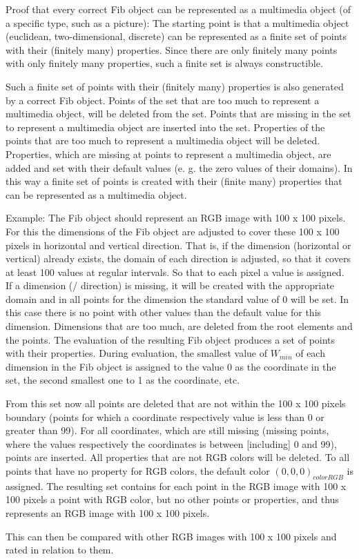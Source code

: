 \bigskip\noindent
Proof that every correct Fib object can be represented as a multimedia object (of a specific type, such as a picture):
The starting point is that a multimedia object (euclidean, two-dimensional, discrete) can be represented as a finite set of points with their (finitely many) properties. Since there are only finitely many points with only finitely many properties, such a finite set is always constructible.

Such a finite set of points with their (finitely many) properties is also generated by a correct Fib object. Points of the set that are too much to represent a multimedia object, will be deleted from the set. Points that are missing in the set to represent a multimedia object are inserted into the set. Properties of the points that are too much to represent a multimedia object will be deleted. Properties, which are missing at points to represent a multimedia object, are added and set with their default values (e. g. the zero values of their domains). In this way a finite set of points is created with their (finite many) properties that can be represented as a multimedia object.

\bigskip\noindent
Example: The Fib object should represent an RGB image with 100 x 100 pixels. For this the dimensions of the Fib object are adjusted to cover these 100 x 100 pixels in horizontal and vertical direction. That is, if the dimension (horizontal or vertical) already exists, the domain of each direction is adjusted, so that it covers at least 100 values at regular intervals. So that to each pixel a value is assigned. If a dimension (/ direction) is missing, it will be created with the appropriate domain and in all points for the dimension the standard value of 0 will be set. In this case there is no point with other values than the default value for this dimension. Dimensions that are too much, are deleted from the root elements and the points. The evaluation of the resulting Fib object produces a set of points with their properties. During evaluation, the smallest value of $W_{min}$ of each dimension in the Fib object is assigned to the value 0 as the coordinate in the set, the second smallest one to 1 as the coordinate, etc.

From this set now all points are deleted that are not within the 100 x 100 pixels boundary (points for which a coordinate respectively value is less than 0 or greater than 99). For all coordinates, which are still missing (missing points, where the values respectively the coordinates is between [including] 0 and 99), points are inserted. All properties that are not RGB colors will be deleted. To all points that have no property for RGB colors, the default color $(0, 0, 0)_{colorRGB}$ is assigned. The resulting set contains for each point in the RGB image with 100 x 100 pixels a point with RGB color, but no other points or properties, and thus represents an RGB image with 100 x 100 pixels.

This can then be compared with other RGB images with 100 x 100 pixels and rated in relation to them.












